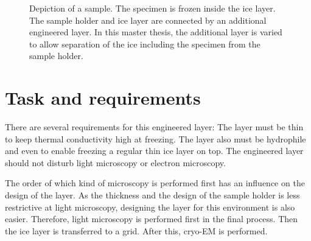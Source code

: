 \begin{figure}[hbt!]
	\centering
	
	\caption{Depiction of a sample. The specimen is frozen inside the ice layer. The sample holder and ice layer are connected by an additional engineered layer. In this master thesis, the additional layer is varied to allow separation of the ice including the specimen from the sample holder.}
	\label{fig:layersingeneral}
\end{figure}


\section{Task and requirements}


There are several requirements for this engineered layer: The layer must be thin to keep thermal conductivity high at freezing. The layer also must be hydrophile and even to  enable freezing a regular thin ice layer on top. The engineered layer should not disturb light microscopy or electron microscopy. 




The order of which kind of microscopy is performed first has an influence on the design of the layer. As the thickness and the design of the sample holder is less restrictive at light microscopy, designing the layer for this environment is also easier. Therefore, light microscopy is performed first in the final process. Then the ice layer is transferred to a grid. After this, cryo-EM is performed.


